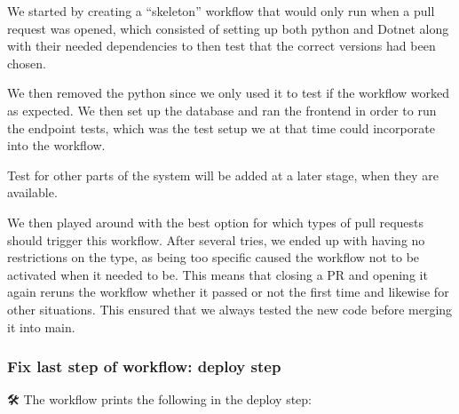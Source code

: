 We started by creating a ``skeleton'' workflow that would only run when
a pull request was opened, which consisted of setting up both python and
Dotnet along with their needed dependencies to then test that the
correct versions had been chosen.

We then removed the python since we only used it to test if the workflow
worked as expected. We then set up the database and ran the frontend in
order to run the endpoint tests, which was the test setup we at that
time could incorporate into the workflow.

Test for other parts of the system will be added at a later stage, when
they are available.

We then played around with the best option for which types of pull
requests should trigger this workflow. After several tries, we ended up
with having no restrictions on the type, as being too specific caused
the workflow not to be activated when it needed to be. This means that
closing a PR and opening it again reruns the workflow whether it passed
or not the first time and likewise for other situations. This ensured
that we always tested the new code before merging it into main.

\subsubsection{Fix last step of workflow: deploy step}
\label{log:fix-last-step-of-workflow-deploy-step}

🛠 The workflow prints the following in the deploy step:


